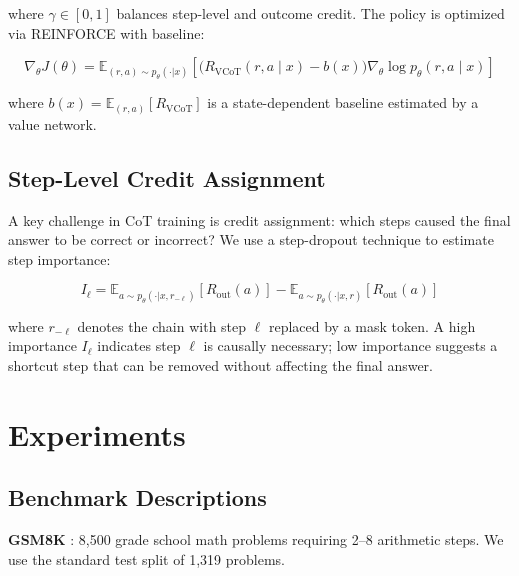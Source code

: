 \documentclass[11pt,a4paper]{article}
\begin{document}
where $\gamma \in [0,1]$ balances step-level and outcome credit. The policy is optimized
via REINFORCE with baseline:

\begin{equation}
    \nabla_\theta J(\theta) = \mathbb{E}_{(r,a) \sim p_\theta(\cdot|x)}\!\left[
    \bigl(R_{\text{VCoT}}(r,a \mid x) - b(x)\bigr)
    \nabla_\theta \log p_\theta(r, a \mid x)
    \right]
    \label{eq:reinforce}
\end{equation}

where $b(x) = \mathbb{E}_{(r,a)}[R_{\text{VCoT}}]$ is a state-dependent baseline
estimated by a value network.

\subsection{Step-Level Credit Assignment}

A key challenge in CoT training is credit assignment: which steps caused the final
answer to be correct or incorrect? We use a step-dropout technique to estimate step
importance:

\begin{equation}
    I_\ell = \mathbb{E}_{a \sim p_\theta(\cdot|x, r_{-\ell})}\!\left[R_{\text{out}}(a)\right]
    - \mathbb{E}_{a \sim p_\theta(\cdot|x, r)}\!\left[R_{\text{out}}(a)\right]
    \label{eq:step_importance}
\end{equation}

where $r_{-\ell}$ denotes the chain with step $\ell$ replaced by a mask token. A high
importance $I_\ell$ indicates step $\ell$ is causally necessary; low importance
suggests a shortcut step that can be removed without affecting the final answer.

\section{Experiments}
\label{sec:experiments}

\subsection{Benchmark Descriptions}

\textbf{GSM8K} \cite{cobbe2021training}: 8,500 grade school math problems requiring
2--8 arithmetic steps. We use the standard test split of 1,319 problems.
\end{document}
